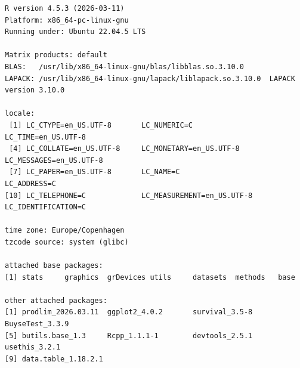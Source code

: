 \documentclass[12pt]{article}
\begin{document}
\begin{verbatim}
R version 4.5.3 (2026-03-11)
Platform: x86_64-pc-linux-gnu
Running under: Ubuntu 22.04.5 LTS

Matrix products: default
BLAS:   /usr/lib/x86_64-linux-gnu/blas/libblas.so.3.10.0 
LAPACK: /usr/lib/x86_64-linux-gnu/lapack/liblapack.so.3.10.0  LAPACK version 3.10.0

locale:
 [1] LC_CTYPE=en_US.UTF-8       LC_NUMERIC=C               LC_TIME=en_US.UTF-8       
 [4] LC_COLLATE=en_US.UTF-8     LC_MONETARY=en_US.UTF-8    LC_MESSAGES=en_US.UTF-8   
 [7] LC_PAPER=en_US.UTF-8       LC_NAME=C                  LC_ADDRESS=C              
[10] LC_TELEPHONE=C             LC_MEASUREMENT=en_US.UTF-8 LC_IDENTIFICATION=C       

time zone: Europe/Copenhagen
tzcode source: system (glibc)

attached base packages:
[1] stats     graphics  grDevices utils     datasets  methods   base     

other attached packages:
[1] prodlim_2026.03.11  ggplot2_4.0.2       survival_3.5-8      BuyseTest_3.3.9    
[5] butils.base_1.3     Rcpp_1.1.1-1        devtools_2.5.1      usethis_3.2.1      
[9] data.table_1.18.2.1


\end{verbatim}
\end{document}
